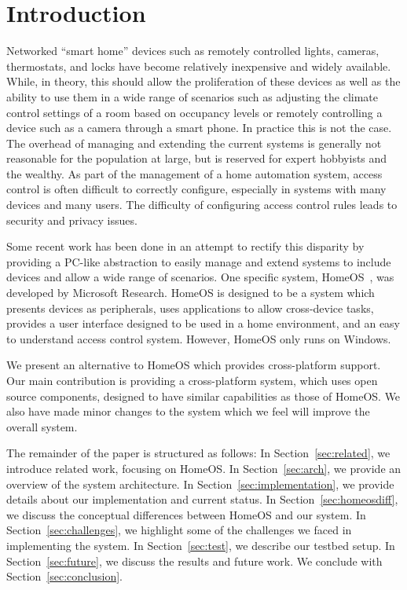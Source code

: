 \section{Introduction}
\label{sec:intro}
Networked ``smart home'' devices such as remotely controlled lights, cameras,
thermostats, and locks have become relatively inexpensive and widely available.
While, in theory, this should allow the proliferation of these devices as well
as the ability to use them in a wide range of scenarios such as adjusting the
climate control settings of a room based on occupancy levels or remotely
controlling a device such as a camera through a smart phone. In practice this is
not the case. The overhead of managing and extending the current systems is
generally not reasonable for the population at large, but is reserved for
expert hobbyists and the wealthy. As part of the management of a home automation
system, access control is often difficult to correctly configure, especially in
systems with many devices and many users. The difficulty of configuring access
control rules leads to security and privacy issues.

Some recent work has been done in an attempt to rectify this disparity by
providing a PC-like abstraction to easily manage and extend systems to include
devices and allow a wide range of scenarios. One specific system,
HomeOS~\cite{homeOS}, was developed by Microsoft Research. HomeOS is designed to
be a system which presents devices as peripherals, uses applications to allow
cross-device tasks, provides a user interface designed to be used in a home
environment, and an easy to understand access control system. However, HomeOS
only runs on Windows.

We present an alternative to HomeOS which provides cross-platform support. Our
main contribution is providing a cross-platform system, which uses open source
components, designed to have similar capabilities as those of HomeOS. We also
have made minor changes to the system which we feel will improve the overall
system.

The remainder of the paper is structured as follows: In
Section~\ref{sec:related}, we introduce related work, focusing on HomeOS. In
Section~\ref{sec:arch}, we provide an overview of the system architecture. In
Section~\ref{sec:implementation}, we provide details about our implementation
and current status. In Section~\ref{sec:homeosdiff}, we discuss the conceptual
differences between HomeOS and our system. In Section~\ref{sec:challenges}, we
highlight some of the challenges we faced in implementing the system. In
Section~\ref{sec:test}, we describe our testbed setup. In
Section~\ref{sec:future}, we discuss the results and future work. We conclude
with Section~\ref{sec:conclusion}.
